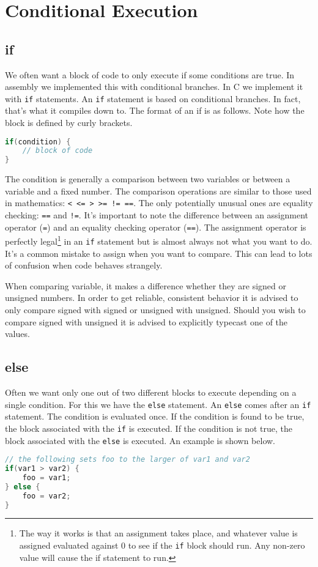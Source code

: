 \chapter{Conditional Execution}
\section{if}
We often want a block of code to only execute if some conditions are true. In assembly we implemented this with conditional branches. In C we implement it with \texttt{if} statements.
An \texttt{if} statement is based on conditional branches. In fact, that's what it compiles down to. The format of an if is as follows. Note how the block is defined by curly brackets. 

\begin{lstlisting}[language=C]
if(condition) {
    // block of code
}
\end{lstlisting}

The condition is generally a comparison between two variables or between a variable and a fixed number. The comparison operations are similar to those used in mathematics: \texttt{< <= > >= != ==}. 
The only potentially unusual ones are equality checking: \texttt{==} and \texttt{!=}. 
It's important to note the difference between an assignment operator (\texttt{=}) and an equality checking operator (\texttt{==}). 
The assignment operator is perfectly legal\footnote{The way it works is that an assignment takes place, and whatever value is assigned evaluated against 0 to see if the \texttt{if} block should run. Any non-zero value will cause the if statement to run.} in an \texttt{if} statement but is almost always not what you want to do. 
It's a common mistake to assign when you want to compare. 
This can lead to lots of confusion when code behaves strangely. 

When comparing variable, it makes a difference whether they are signed or unsigned numbers. In order to get reliable, consistent behavior it is advised to only compare signed with signed or unsigned with unsigned. Should you wish to compare signed with unsigned it is advised to explicitly typecast one of the values. 

\section{else}
Often we want only one out of two different blocks to execute depending on a single condition. 
For this we have the \texttt{else} statement. 
An \texttt{else} comes after an \texttt{if} statement. 
The condition is evaluated once. 
If the condition is found to be true, the block associated with the \texttt{if} is executed. 
If the condition is not true, the block associated with the \texttt{else} is executed. An example is shown below.

\begin{lstlisting}[language=C]
// the following sets foo to the larger of var1 and var2
if(var1 > var2) {
    foo = var1;
} else {
    foo = var2;
}
\end{lstlisting}
